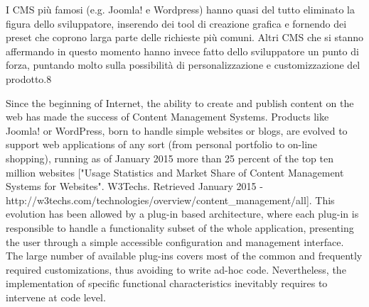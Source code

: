 I CMS più famosi (e.g. Joomla! e Wordpress) hanno quasi del tutto eliminato la figura dello sviluppatore, inserendo dei tool di creazione grafica e fornendo dei preset che coprono larga parte delle richieste più comuni. Altri CMS che si stanno affermando in questo momento hanno invece fatto dello sviluppatore un punto di forza, puntando molto sulla possibilità di personalizzazione e customizzazione del prodotto.8

Since the beginning of Internet, the ability to create and publish content on the web has made the success of Content Management Systems. Products like Joomla! or WordPress, born to handle simple websites or blogs, are evolved to support web applications of any sort (from personal portfolio to on-line shopping), running as of January 2015 more than 25 percent of the top ten million websites ["Usage Statistics and Market Share of Content Management Systems for Websites". W3Techs. Retrieved January 2015 - http://w3techs.com/technologies/overview/content_management/all]. This evolution has been allowed by a plug-in based architecture, where each plug-in is responsible to handle a functionality subset of the whole application, presenting the user through a simple accessible configuration and management interface.
The large number of available plug-ins covers most of the common and frequently required customizations, thus avoiding to write ad-hoc code. Nevertheless, the implementation of specific functional characteristics inevitably requires to intervene at code level.
